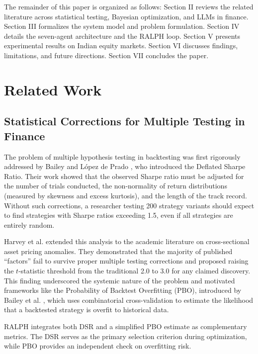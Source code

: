 \documentclass[conference]{IEEEtran}
\begin{document}
The remainder of this paper is organized as follows: Section II reviews the related literature across statistical testing, Bayesian optimization, and LLMs in finance. Section III formalizes the system model and problem formulation. Section IV details the seven-agent architecture and the RALPH loop. Section V presents experimental results on Indian equity markets. Section VI discusses findings, limitations, and future directions. Section VII concludes the paper.

\section{Related Work}
\label{sec:related}

\subsection{Statistical Corrections for Multiple Testing in Finance}
The problem of multiple hypothesis testing in backtesting was first rigorously addressed by Bailey and L\'{o}pez de Prado \cite{bailey2014deflated}, who introduced the Deflated Sharpe Ratio. Their work showed that the observed Sharpe ratio must be adjusted for the number of trials conducted, the non-normality of return distributions (measured by skewness and excess kurtosis), and the length of the track record. Without such corrections, a researcher testing 200 strategy variants should expect to find strategies with Sharpe ratios exceeding 1.5, even if all strategies are entirely random.

Harvey et al. \cite{harvey2016backtesting} extended this analysis to the academic literature on cross-sectional asset pricing anomalies. They demonstrated that the majority of published ``factors'' fail to survive proper multiple testing corrections and proposed raising the $t$-statistic threshold from the traditional 2.0 to 3.0 for any claimed discovery. This finding underscored the systemic nature of the problem and motivated frameworks like the Probability of Backtest Overfitting (PBO), introduced by Bailey et al. \cite{bailey2017probability}, which uses combinatorial cross-validation to estimate the likelihood that a backtested strategy is overfit to historical data.

RALPH integrates both DSR and a simplified PBO estimate as complementary metrics. The DSR serves as the primary selection criterion during optimization, while PBO provides an independent check on overfitting risk.
\end{document}
